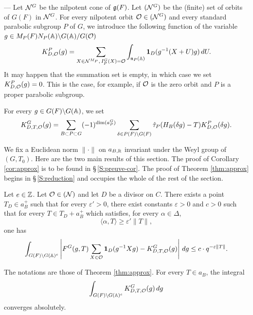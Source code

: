 \begin{paragr} --- \label{S:enonces} Let $\mathcal{N}^G$ be the nilpotent cone of $\mathfrak{g}(F)$. Let $(\mathcal{N}^G)$ be the (finite) set of orbits of $G(F)$ in $\mathcal{N}^G$. For every nilpotent orbit $\mathcal{O}\in (\mathcal{N}^G)$ and every standard parabolic subgroup $P$ of $G$, we introduce the following function of the variable $g\in M_P(F)N_P(\mathbb{A})\backslash G(\mathbb{A})/G(\mathcal{O})$
$$K^P_{D,\mathcal{O}}(g)=\sum_{X\in \mathcal{N}^{M_P},\, I_P^G(X)=\mathcal{O}} \int_{\mathfrak{n}_P(\mathbb{A})} \mathbf{1}_D(g^{-1}(X+U)g)\,dU.$$
It may happen that the summation set is empty, in which case we set $K^P_{D,\mathcal{O}}(g)=0$. This is the case, for example, if $\mathcal{O}$ is the zero orbit and $P$ is a proper parabolic subgroup.

For every $g\in G(F)\backslash G(\mathbb{A})$, we set
\begin{equation}
  \label{eq:KDTO}
  K^G_{D,T,\mathcal{O}}(g)=\sum_{B\subset P\subset G} (-1)^{\dim(a_P^G)} \sum_{\delta\in P(F)\backslash G(F)} \hat{\tau}_P(H_B(\delta g)-T) K^P_{D,\mathcal{O}}(\delta g).
\end{equation}

We fix a Euclidean norm $\|\cdot\|$ on $a_{B,\mathbb{R}}$ invariant under the Weyl group of $(G,T_0)$. Here are the two main results of this section. The proof of Corollary \ref{cor:approx} is to be found in \S\,\ref{S:preuve-cor}. The proof of Theorem \ref{thm:approx} begins in \S\,\ref{S:reduction} and occupies the whole of the rest of the section.

\begin{theoreme}\label{thm:approx}
  Let $e\in \mathbb{Z}$. Let $\mathcal{O}\in (\mathcal{N})$ and let $D$ be a divisor on $C$. There exists a point $T_D\in a_B^+$ such that for every $\varepsilon'>0$, there exist constants $\varepsilon>0$ and $c>0$ such that for every $T\in T_D+a_B^+$ which satisfies, for every $\alpha\in \Delta$,
$$\langle \alpha, T\rangle \geq \varepsilon' \|T\|,$$
one has
$$\int_{G(F)\backslash G(\mathbb{A})^e} \left| F^G(g,T) \sum_{X\in \mathcal{O}} \mathbf{1}_D(g^{-1}Xg) - K^G_{D,T,\mathcal{O}}(g)\right|\, dg\leq c\cdot q^{-\varepsilon\|T\|}.$$
\end{theoreme}

\begin{corollaire}\label{cor:approx}
  The notations are those of Theorem \ref{thm:approx}. For every $T\in a_B$, the integral
  \begin{equation}
    \label{eq:integrale-KDTO}
    \int_{G(F)\backslash G(\mathbb{A})^e} K^G_{D,T,\mathcal{O}}(g)\, dg
  \end{equation}
converges absolutely.


\end{corollaire}
\end{paragr}
